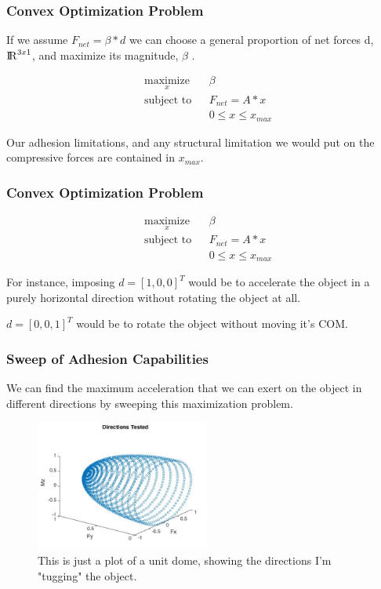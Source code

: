 \documentclass{beamer}
\begin{document}
\frame
{
\frametitle{ Convex Optimization Problem }

If we assume $ F_{net} = \beta*d $ we can choose a general proportion of net forces d, ${\rm I\!R} ^{3 x 1}$,  and maximize its magnitude, $\beta$ .
	
\begin{equation*}
	\begin{aligned}
	& \underset{x}{\text{maximize}}
	& & \beta \\
	& \text{subject to}
	& & F_{net} = A * x \\
	&
	& & 0 \leq x \leq x_{max}
	\end{aligned}
\end{equation*}

Our adhesion limitations, and any structural limitation we would put on the compressive forces are contained in $x_{max}$. 
	
}


\frame
{
\frametitle{ Convex Optimization Problem }

	
\begin{equation*}
	\begin{aligned}
	& \underset{x}{\text{maximize}}
	& & \beta \\
	& \text{subject to}
	& & F_{net} = A * x \\
	&
	& & 0 \leq x \leq x_{max}
	\end{aligned}
\end{equation*}

For instance, imposing $d = [1, 0, 0]^{T}$ would be to accelerate the object in a purely horizontal direction without rotating the object at all. 

$d = [0, 0, 1]^{T}$ would be to rotate the object without moving it's COM. 
	
}


\frame
{
\frametitle{ Sweep of Adhesion Capabilities }

We can find the maximum acceleration that we can exert on the object in different directions by sweeping this maximization problem. 

\begin{figure}[htb]
	\centering
	\includegraphics[width=2.25in]{images/directions.jpg}
	\caption{This is just a plot of a unit dome, showing the directions I'm "tugging" the object.}
	\label{fig:directions}
\end{figure}
	
}
\end{document}
